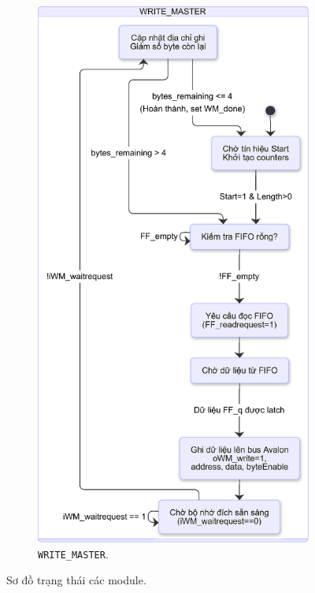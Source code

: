 \begin{figure}[htbp]
    \begin{subfigure}[b]{0.48\textwidth}
        \centering
        \includegraphics[width=\linewidth]{Images/02_13_StateDiagram_WriteMaster.pdf}
        \caption{\texttt{WRITE\_MASTER}.}
        \label{fig:02_13_StateDiagram_WriteMaster}
    \end{subfigure}
    \caption{Sơ đồ trạng thái các module.}
    \label{fig:StateDiagram_ReadWriteMaster} %
\end{figure}